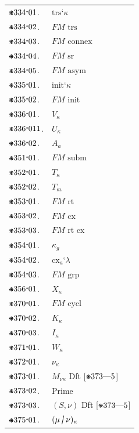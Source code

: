 \documentclass[12pt,openany,leqno,twocolumn]{book}
\newcommand{\pmast}{\text{\resizebox{!}{.75\height}{\ding{107}}}} %
\newcommand{\pmcdot}{\text{\raisebox{.05cm}{$\boldsymbol\cdot$}}} %
\newcommand{\pmtrsp}[1]{\text{trs}\textbf{`}#1} %
\newcommand{\pmfmtrs}{\textit{FM}\text{ trs}} %
\newcommand{\pmfmconnex}{\textit{FM}\text{ connex}} %
\newcommand{\pmfmsr}{\textit{FM}\text{ sr}} %
\newcommand{\pmfmasym}{\textit{FM}\text{ asym}} %
\newcommand{\pminit}[1]{\text{init}\textbf{`}#1} %
\newcommand{\pmfminit}{\textit{FM}\text{ init}} %
\newcommand{\pmvr}[1]{\textit{V}_#1} %
\newcommand{\pmvrnid}[1]{\textit{U}_#1} %
\newcommand{\pmarvs}[1]{A_{#1}} %
\newcommand{\pmfmsubm}{\textit{FM}\text{ subm}} %
\newcommand{\pmvrm}[2]{#1_#2} %
\newcommand{\pmvrmg}[2]{#1_{#2\iota}} %
\newcommand{\pmfmrt}{\textit{FM}\text{ rt}} %
\newcommand{\pmfmcx}{\textit{FM}\text{ cx}} %
\newcommand{\pmfmrtcx}{\textit{FM}\text{ rt cx}} %
\newcommand{\pmfmg}[1]{#1_g} %
\newcommand{\pmrtnet}[2]{\text{cx}_#1\textbf{`}#2} %
\newcommand{\pmfmgrp}{\textit{FM}\text{ grp}} %
\newcommand{\pmrems}[2]{#1_#2} %
\newcommand{\pmfmcycl}{\textit{FM}\text{ cycl}} %
\newcommand{\pmcycl}[2]{#1_#2} %
\newcommand{\pmcycli}[2]{#1_#2} %
\newcommand{\pmvser}[2]{#1_#2} %
\newcommand{\pmintsecvser}[2]{#1_#2} %
\newcommand{\pmprime}{\text{Prime}} %
\newcommand{\pmsfmid}[3]{#1_{#2#3}} %
\newcommand{\pmsmltid}[2]{(#1, #2)} %
\newcommand{\pmprrt}[3]{(#1 \rotatebox[origin=c]{10}{$\boldsymbol{/}$} #2)_{#3}} %
\begin{document}
\begin{tabular}{l l}
	$\pmast334\pmcdot01$. & $\pmtrsp{\kappa}$ \\
	$\pmast334\pmcdot02$. & $\pmfmtrs$ \\
	$\pmast334\pmcdot03$. & $\pmfmconnex$ \\
	$\pmast334\pmcdot04$. & $\pmfmsr$ \\
	$\pmast334\pmcdot05$. & $\pmfmasym$ \\
	$\pmast335\pmcdot01$. & $\pminit{\kappa}$ \\
	$\pmast335\pmcdot02$. & $\pmfminit$ \\
	$\pmast336\pmcdot01$. & $\pmvr{\kappa}$ \\
	$\pmast336\pmcdot011$. & $\pmvrnid{\kappa}$ \\
	$\pmast336\pmcdot02$. & $\pmarvs{a}$ \\
	$\pmast351\pmcdot01$. & $\pmfmsubm$ \\
	$\pmast352\pmcdot01$. & $\pmvrm{T}{\kappa}$ \\
	$\pmast352\pmcdot02$. & $\pmvrmg{T}{\kappa}$ \\
	$\pmast353\pmcdot01$. & $\pmfmrt$ \\
	$\pmast353\pmcdot02$. & $\pmfmcx$ \\
	$\pmast353\pmcdot03$. & $\pmfmrtcx$ \\
	$\pmast354\pmcdot01$. & $\pmfmg{\kappa}$ \\
	$\pmast354\pmcdot02$. & $\pmrtnet{a}{\lambda}$ \\
	$\pmast354\pmcdot03$. & $\pmfmgrp$ \\
	$\pmast356\pmcdot01$. & $\pmrems{X}{\kappa}$ \\
	$\pmast370\pmcdot01$. & $\pmfmcycl$ \\
	$\pmast370\pmcdot02$. & $\pmcycl{K}{\kappa}$ \\
	$\pmast370\pmcdot03$. & $\pmcycli{I}{\kappa}$ \\
	$\pmast371\pmcdot01$. & $\pmvser{W}{\kappa}$ \\
	$\pmast372\pmcdot01$. & $\pmintsecvser{\nu}{\kappa}$ \\
	$\pmast373\pmcdot01$. & $\pmsfmid{M}{\nu}{\kappa}$ \hspace{2ex} Dft [\(\pmast373\text{---}5\)]\\
	$\pmast373\pmcdot02$. & $\pmprime$ \\
	$\pmast373\pmcdot03$. & $\pmsmltid{S}{\nu}$ \hspace{0.75ex} Dft [\(\pmast373\text{---}5\)]\\
	$\pmast375\pmcdot01$. & $\pmprrt{\mu}{\nu}{\kappa}$ 
\end{tabular}
\end{document}
